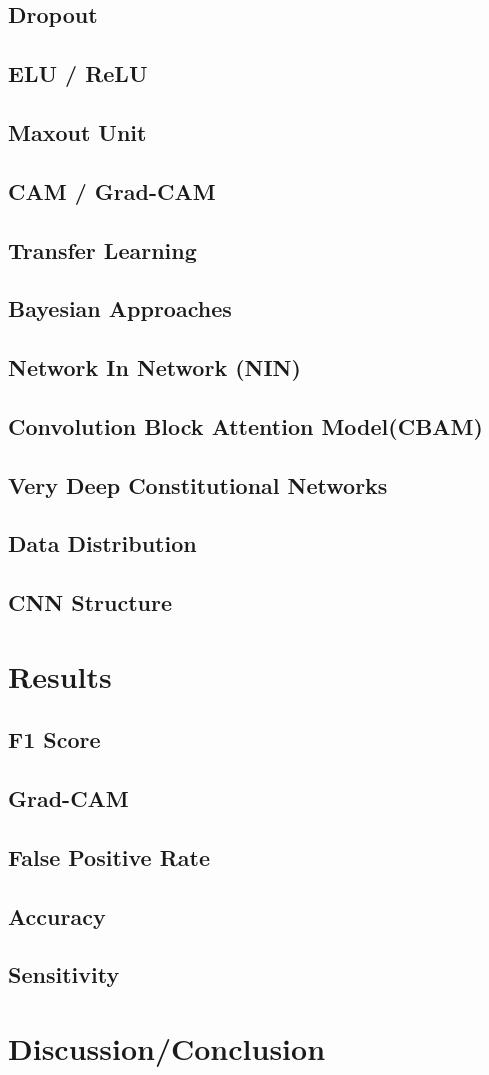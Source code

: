 \documentclass[acmsmall, review]{acmart}
\begin{document}
\subsection{Dropout}

\subsection{ELU / ReLU}
\subsection{Maxout Unit}
\subsection{CAM / Grad-CAM}
\subsection{Transfer Learning}
\subsection{Bayesian Approaches}
\subsection{Network In Network (NIN)}
\subsection{Convolution Block Attention Model(CBAM)}
\subsection{Very Deep Constitutional Networks}
\subsection{Data Distribution}
\subsection{CNN Structure}


\section{Results}
\subsection{F1 Score}
\subsection{Grad-CAM}
\subsection{False Positive Rate}
\subsection{Accuracy}
\subsection{Sensitivity}
\section{Discussion/Conclusion}
\end{document}
